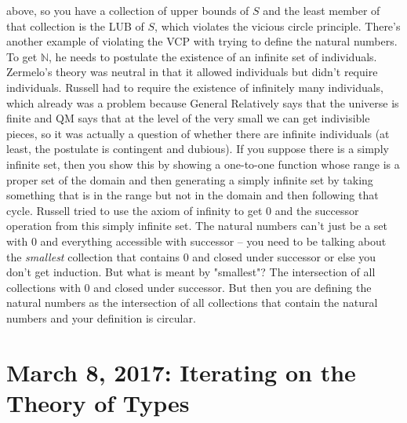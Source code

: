 \documentclass[12pt]{article}
\theoremstyle{definition}
\begin{document}
\begin{enumerate}
        above, so you have a collection of upper bounds of $S$ and the least
        member of that collection is the LUB of $S$, which violates the vicious
        circle principle. There's another example of violating the VCP with
        trying to define the natural numbers. To get $\mathbb{N}$, he needs to
        postulate the existence of an infinite set of individuals. Zermelo's
        theory was neutral in that it allowed individuals but didn't require
        individuals. Russell had to require the existence of infinitely many
        individuals, which already was a problem because General Relatively
        says that the universe is finite and QM says that at the level of the
        very small we can get indivisible pieces, so it was actually a question
        of whether there are infinite individuals (at least, the postulate is
        contingent and dubious). If you suppose there is a simply infinite set,
        then you show this by showing a one-to-one function whose range is a
        proper set of the domain and then generating a simply infinite set by
        taking something that is in the range but not in the domain and then
        following that cycle. Russell tried to use the axiom of infinity to get
        0 and the successor operation from this simply infinite set. The
        natural numbers can't just be a set with 0 and everything accessible
        with successor -- you need to be talking about the \textit{smallest}
        collection that contains 0 and closed under successor or else you
        don't get induction. But what is meant by "smallest"? The intersection
        of all collections with 0 and closed under successor. But then you are
        defining the natural numbers as the intersection of all collections
        that contain the natural numbers and your definition is circular. 
\end{enumerate}

\section{March 8, 2017: Iterating on the Theory of Types}
\end{document}
